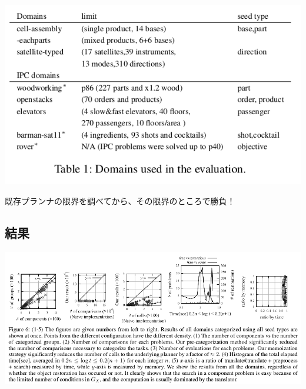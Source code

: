 \includegraphics[width=.9\linewidth]{img/static/eval.png}

既存プランナの限界を調べてから、その限界のところで勝負！

\subsection{結果}
\label{sec-3-1}

\includegraphics[width=.9\linewidth]{img/static/result.png}
